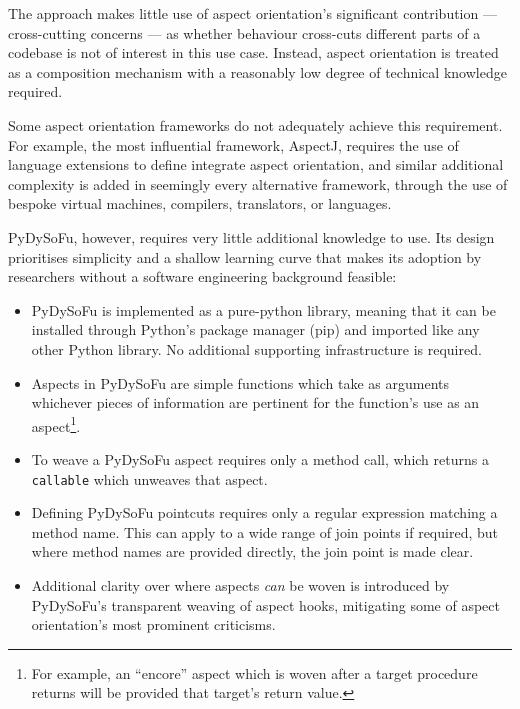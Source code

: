 The approach makes little use of aspect orientation's significant contribution
--- cross-cutting concerns --- as whether behaviour cross-cuts different parts
of a codebase is not of interest in this use case. Instead, aspect orientation
is treated as a composition mechanism with a reasonably low degree of technical
knowledge required.

Some aspect orientation frameworks do not adequately achieve this requirement.
For example, the most influential framework, AspectJ, requires the use of
language extensions to define integrate aspect
orientation\cite{AspectJLanguageAndTools}, and similar additional complexity is
added in seemingly every alternative framework, through the use of bespoke
virtual machines, compilers, translators, or
languages\cite{rajan2006nu_towardsAO_invocation,popovici2003JITaspects,AspectCplusplusDesignImpl,baker2002maya}.

PyDySoFu, however, requires very little additional knowledge to use. Its design
prioritises simplicity and a shallow learning curve that makes its adoption by
researchers without a software engineering background feasible: 

\begin{itemize}
    \item PyDySoFu is implemented as a pure-python library, meaning that it can
    be installed through Python's package manager (pip) and imported like any
    other Python library. No additional supporting infrastructure is required.
    \item Aspects in PyDySoFu are simple functions which take as arguments
    whichever pieces of information are pertinent for the function's use as an
    aspect\footnote{For example, an ``encore'' aspect which is woven after a
    target procedure returns will be provided that target's return value.}.
    \item To weave a PyDySoFu aspect requires only a method call, which returns a
    \lstinline{callable} which unweaves that aspect.
    \item Defining PyDySoFu pointcuts requires only a regular expression
    matching a method name. This can apply to a wide range of join points if
    required, but where method names are provided directly, the join point is
    made clear.
    \item Additional clarity over where aspects \emph{can} be woven is
    introduced by PyDySoFu's transparent weaving of aspect hooks, mitigating
    some of aspect orientation's most prominent criticisms.
\end{itemize}

